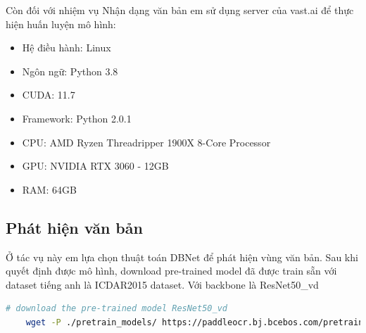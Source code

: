Còn đối với nhiệm vụ Nhận dạng văn bản em sử dụng server của vast.ai để thực hiện huấn luyện mô hình:
\begin{itemize}
    \item Hệ điều hành: Linux
    \item Ngôn ngữ: Python 3.8
    \item CUDA: 11.7
    \item Framework: Python 2.0.1
    \item CPU: AMD Ryzen Threadripper 1900X 8-Core Processor
    \item GPU: NVIDIA RTX 3060 - 12GB
    \item RAM: 64GB 
\end{itemize}

\subsection{Phát hiện văn bản}
Ở tác vụ này em lựa chọn thuật toán DBNet để phát hiện vùng văn bản. Sau khi quyết định được mô hình, download pre-trained model đã được train sẵn với dataset tiếng anh là ICDAR2015 dataset. Với backbone là ResNet50\_vd
\begin{lstlisting}[language=bash]
    # download the pre-trained model ResNet50_vd
    wget -P ./pretrain_models/ https://paddleocr.bj.bcebos.com/pretrained/ResNet50_vd_ssld_pretrained.pdparams
\end{lstlisting}

